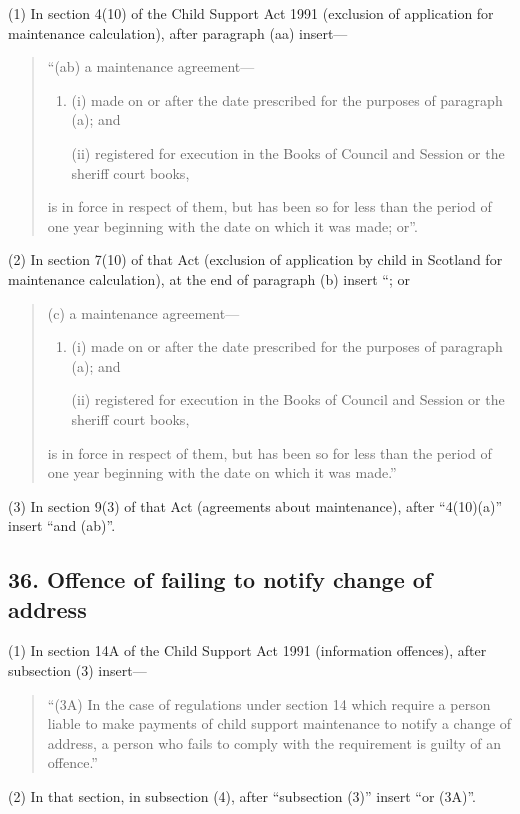 \documentclass[a4paper]{article}
\begin{document}
(1) In section 4(10) of the Child Support Act 1991 (exclusion of application for maintenance calculation), after paragraph (aa) insert---
\begin{quotation}
“(ab) a maintenance agreement—
\begin{enumerate}\item[]
(i) made on or after the date prescribed for the purposes of paragraph (a); and

(ii) registered for execution in the Books of Council and Session or the sheriff court books,
\end{enumerate}
is in force in respect of them, but has been so for less than the period of one year beginning with the date on which it was made; or”.
\end{quotation}

(2) In section 7(10) of that Act (exclusion of application by child in Scotland for maintenance calculation), at the end of paragraph (b) insert “; or 
\begin{quotation}
(c) a maintenance agreement—
\begin{enumerate}\item[]
(i) made on or after the date prescribed for the purposes of paragraph (a); and

(ii) registered for execution in the Books of Council and Session or the sheriff court books,
\end{enumerate}
is in force in respect of them, but has been so for less than the period of one year beginning with the date on which it was made.”
\end{quotation}

(3) In section 9(3) of that Act (agreements about maintenance), after “4(10)(a)” insert “and (ab)”.

\subsection{36. Offence of failing to notify change of address}

(1) In section 14A of the Child Support Act 1991 (information offences), after subsection (3) insert—
\begin{quotation}
“(3A) In the case of regulations under section 14 which require a person liable to make payments of child support maintenance to notify a change of address, a person who fails to comply with the requirement is guilty of an offence.”
\end{quotation}

(2) In that section, in subsection (4), after “subsection (3)” insert “or (3A)”.
\end{document}
